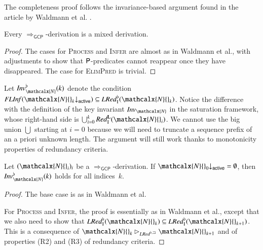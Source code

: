 \begin{rep}
\begin{sloppypar}
   The completeness proof follows the invariance-based argument found in the
   article by Waldmann et al. \cite{waldmann-et-al-202x-article}.
\end{sloppypar}

\begin{lemma}
\label{lem:gcp-derivations-are-red-black-derivations}
Every $\Longrightarrow_\mathsf{GCP}$-derivation is a mixed derivation.
\end{lemma}

\begin{proof}
The cases for \textsc{Process} and \textsc{Infer} are almost as in Waldmann et
al., with adjustments to show that $\mathsf{P}$-predicates cannot reappear once
they have disappeared. The case for \textsc{ElimPred} is trivial.
\end{proof}

Let $\Inv\Wksup_\mathcalx{N}(k)$ denote the condition
$\textstyle\FLInf(\mathcalx{N}{}_k{\downarrow}_\mathsf{active}) \subseteq
\LRedIWk(\mathcalx{N}{}_k)$.
Notice the difference with the definition of the key invariant
$\Inv_\mathcalx{N}$ in the saturation framework, whose right-hand side is
$\bigcup_{i=0}^k \RedI^{\Lab}(\mathcalx{N}{}_i)$. We cannot use the
big union ${\bigcup}$ starting at $i = 0$ because we will need to truncate a
sequence prefix of an a priori unknown length. The argument will still work
thanks to monotonicity properties of redundancy criteria.

\begin{lemma}
\label{lem:gcp-invar-gcp}
Let $(\mathcalx{N}{}_i)_i$ be a $\Longrightarrow_\mathsf{GCP}$-derivation.
If
$\mathcalx{N}{}_0{\downarrow}_\mathsf{active} = \emptyset$,
then
$\Inv\Wksup_\mathcalx{N}(k)$ holds for all indices~$k$.
\end{lemma}

\begin{proof}
The base case is as in Waldmann et al.

For \textsc{Process} and \textsc{Infer}, the proof is essentially as in Waldmann
et al., except that we also need to show that
$\LRedIWk(\mathcalx{N}{}_k) \subseteq \LRedIWk(\mathcalx{N}{}_{k+1})$.
This is a consequence of
$\mathcalx{N}{}_k \rhd_{\LRedWksub} \mathcalx{N}{}_{k+1}$ and of
properties (R2) and (R3) of redundancy criteria.

\begin{sloppypar}
   

\end{sloppypar}
\end{proof}
\end{rep}
